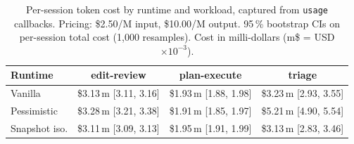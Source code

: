 \begin{table}[t]
\centering
\caption{Per-session token cost by runtime and workload, captured from \texttt{usage} callbacks. Pricing: \$2.50/M input, \$10.00/M output. 95\,\% bootstrap CIs on per-session total cost (1{,}000 resamples). Cost in milli-dollars (m\$ = USD $\times 10^{-3}$).}
\label{tab:cost-measured}
\small
\begin{tabular}{lccc}
\toprule
Runtime & edit-review & plan-execute & triage \\
\midrule
Vanilla        & \$3.13\,m [3.11, 3.16] & \$1.93\,m [1.88, 1.98] & \$3.23\,m [2.93, 3.55] \\
Pessimistic    & \$3.28\,m [3.21, 3.38] & \$1.91\,m [1.85, 1.97] & \$5.21\,m [4.90, 5.54] \\
Snapshot iso.  & \$3.11\,m [3.09, 3.13] & \$1.95\,m [1.91, 1.99] & \$3.13\,m [2.83, 3.46] \\
\bottomrule
\end{tabular}
\end{table}

